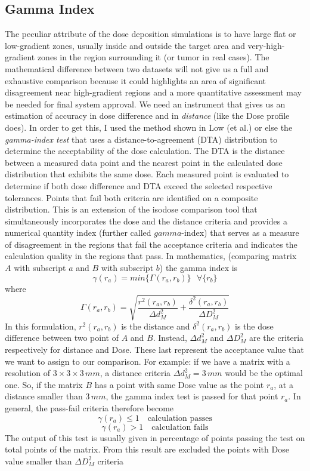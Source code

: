 \documentclass[12pt, a4paper, twoside]{book}
\begin{document}
\subsection{Gamma Index}
The peculiar attribute of the dose deposition simulations is to have large flat or low-gradient zones, usually inside and outside the target area and very-high-gradient zones in the region surrounding it (or tumor in real cases).
The mathematical difference between two datasets will not give us a full and exhaustive comparison because it could highlights an area of significant disagreement near high-gradient regions and a more quantitative assessment may be needed for final system approval.   
We need an instrument that gives us an estimation of accuracy in dose difference and in \emph{distance} (like the Dose profile does).
In order to get this, I used the method shown in Low (et al.) \cite{low:gamma} or else the \emph{gamma-index test} that uses a distance-to-agreement (DTA) distribution to determine the acceptability of the dose calculation. The DTA is the distance between a measured data point and the nearest point in the calculated dose distribution that exhibits the same dose. Each measured point is evaluated to determine if both dose difference and DTA exceed the selected respective tolerances. Points that fail both criteria are identified on a composite distribution. This is an extension of the isodose comparison tool that simultaneously incorporates the dose and the distance criteria and provides a numerical quantity index (further called $gamma$-index) that serves as a measure of disagreement in the regions that fail the acceptance criteria and indicates the calculation quality in the regions that pass. 
In mathematics, (comparing matrix $A$ with subscript $a$ and $B$ with subscript $b$) the gamma index is
\[
\gamma(r_a) = min\{\Gamma(r_a,r_b) \}\,\,\,\,\forall\{ r_b\}
\]
where
\[
\Gamma(r_a,r_b) = \sqrt{\frac{r^2(r_a,r_b)}{\Delta d^2_M} + \frac{\delta^2(r_a,r_b)}{\Delta D^2_M}}
\]
In this formulation, $r^2(r_a,r_b)$ is the distance and $\delta^2(r_a,r_b)$ is the dose difference between two point of $A$ and $B$. Instead, $\Delta d^2_M$ and $\Delta D^2_M$ are the criteria respectively for distance and Dose.
These last represent the acceptance value that we want to assign to our comparison. For example: if we have a matrix with a resolution of $3\times3\times3\,mm$, a distance criteria $\Delta d^2_M = 3\,mm$ would be the optimal one. So, if the matrix $B$ has a point with same Dose value as the point $r_a$, at a distance smaller than $3\,mm$, the gamma index test is passed for that point $r_a$.
In general, the pass-fail criteria therefore become
\[
\gamma(r_a)\leq1\,\,\,\,\,\,\textrm{calculation passes}
\]
\[
\gamma(r_a)>1\,\,\,\,\,\,\textrm{calculation fails}
\]
The output of this test is usually given in percentage of points passing the test on total points of the matrix.
From this result are excluded the points with Dose value smaller than $\Delta D^2_M$ criteria
\end{document}
